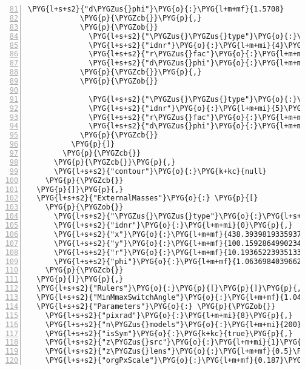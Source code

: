 \begin{Verbatim}[commandchars=\\\{\},numbers=left,firstnumber=81,stepnumber=1,codes={\catcode`\$=3\catcode`\^=7\catcode`\_=8}]
              \PYG{l+s+s2}{"d\PYGZus{}phi"}\PYG{o}{:}\PYG{l+m+mf}{1.5708}
            \PYG{p}{\PYGZcb{}}\PYG{p}{,}
            \PYG{p}{\PYGZob{}}
              \PYG{l+s+s2}{"\PYGZus{}\PYGZus{}type"}\PYG{o}{:}\PYG{l+s+s2}{"cpnt"}\PYG{p}{,}
              \PYG{l+s+s2}{"idnr"}\PYG{o}{:}\PYG{l+m+mi}{4}\PYG{p}{,}
              \PYG{l+s+s2}{"r\PYGZus{}fac"}\PYG{o}{:}\PYG{l+m+mf}{0.5}\PYG{p}{,}
              \PYG{l+s+s2}{"d\PYGZus{}phi"}\PYG{o}{:}\PYG{l+m+mf}{3.1416}
            \PYG{p}{\PYGZcb{}}\PYG{p}{,}
            \PYG{p}{\PYGZob{}}
              
              \PYG{l+s+s2}{"\PYGZus{}\PYGZus{}type"}\PYG{o}{:}\PYG{l+s+s2}{"cpnt"}\PYG{p}{,}
              \PYG{l+s+s2}{"idnr"}\PYG{o}{:}\PYG{l+m+mi}{5}\PYG{p}{,}
              \PYG{l+s+s2}{"r\PYGZus{}fac"}\PYG{o}{:}\PYG{l+m+mf}{0.625}\PYG{p}{,}
              \PYG{l+s+s2}{"d\PYGZus{}phi"}\PYG{o}{:}\PYG{l+m+mf}{4.7124}
            \PYG{p}{\PYGZcb{}}
          \PYG{p}{]}
        \PYG{p}{\PYGZcb{}}
      \PYG{p}{\PYGZcb{}}\PYG{p}{,}
      \PYG{l+s+s2}{"contour"}\PYG{o}{:}\PYG{k+kc}{null}
    \PYG{p}{\PYGZcb{}}
  \PYG{p}{]}\PYG{p}{,}
  \PYG{l+s+s2}{"ExternalMasses"}\PYG{o}{:} \PYG{p}{[}
    \PYG{p}{\PYGZob{}}
      \PYG{l+s+s2}{"\PYGZus{}\PYGZus{}type"}\PYG{o}{:}\PYG{l+s+s2}{"ext\PYGZus{}mass"}\PYG{p}{,}
      \PYG{l+s+s2}{"idnr"}\PYG{o}{:}\PYG{l+m+mi}{0}\PYG{p}{,}
      \PYG{l+s+s2}{"x"}\PYG{o}{:}\PYG{l+m+mf}{438.39398193359375}\PYG{p}{,}
      \PYG{l+s+s2}{"y"}\PYG{o}{:}\PYG{l+m+mf}{100.15928649902344}\PYG{p}{,}
      \PYG{l+s+s2}{"r"}\PYG{o}{:}\PYG{l+m+mf}{10.193652239351335}\PYG{p}{,}
      \PYG{l+s+s2}{"phi"}\PYG{o}{:}\PYG{l+m+mf}{1.0636984039662916}
    \PYG{p}{\PYGZcb{}}
  \PYG{p}{]}\PYG{p}{,}
  \PYG{l+s+s2}{"Rulers"}\PYG{o}{:}\PYG{p}{[}\PYG{p}{]}\PYG{p}{,}
  \PYG{l+s+s2}{"MinMmaxSwitchAngle"}\PYG{o}{:}\PYG{l+m+mf}{1.0471975511965976}\PYG{p}{,}
  \PYG{l+s+s2}{"Parameters"}\PYG{o}{:} \PYG{p}{\PYGZob{}}
    \PYG{l+s+s2}{"pixrad"}\PYG{o}{:}\PYG{l+m+mi}{8}\PYG{p}{,}
    \PYG{l+s+s2}{"n\PYGZus{}models"}\PYG{o}{:}\PYG{l+m+mi}{200}\PYG{p}{,}
    \PYG{l+s+s2}{"isSym"}\PYG{o}{:}\PYG{k+kc}{true}\PYG{p}{,}
    \PYG{l+s+s2}{"z\PYGZus{}src"}\PYG{o}{:}\PYG{l+m+mi}{1}\PYG{p}{,}
    \PYG{l+s+s2}{"z\PYGZus{}lens"}\PYG{o}{:}\PYG{l+m+mf}{0.5}\PYG{p}{,}
    \PYG{l+s+s2}{"orgPxScale"}\PYG{o}{:}\PYG{l+m+mf}{0.187}\PYG{p}{,}
\end{Verbatim}
